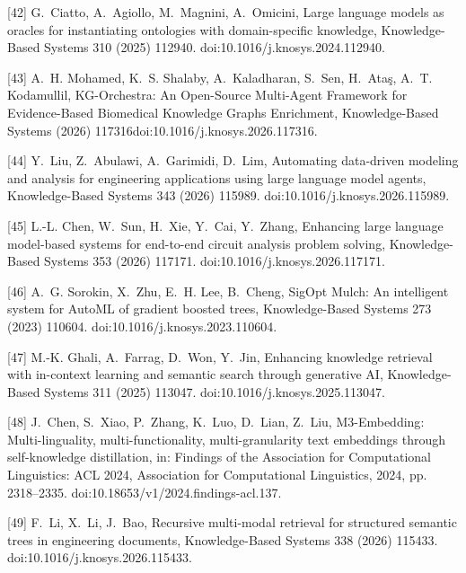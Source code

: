 \documentclass[11pt]{article}
\begin{document}
[42] 
G.~Ciatto, A.~Agiollo, M.~Magnini, A.~Omicini, {Large language models as
  oracles for instantiating ontologies with domain-specific knowledge},
  Knowledge-Based Systems 310 (2025) 112940.
  doi:10.1016/j.knosys.2024.112940.



[43] 
A.~H. Mohamed, K.~S. Shalaby, A.~Kaladharan, S.~Sen, H.~Ata{\c{s}}, A.~T.
  Kodamullil, {KG-Orchestra: An Open-Source Multi-Agent Framework for
  Evidence-Based Biomedical Knowledge Graphs Enrichment}, Knowledge-Based
  Systems (2026) 117316doi:10.1016/j.knosys.2026.117316.



[44] 
Y.~Liu, Z.~Abulawi, A.~Garimidi, D.~Lim, {Automating data-driven modeling and
  analysis for engineering applications using large language model agents},
  Knowledge-Based Systems 343 (2026) 115989.
  doi:10.1016/j.knosys.2026.115989.



[45] 
L.-L. Chen, W.~Sun, H.~Xie, Y.~Cai, Y.~Zhang, {Enhancing large language
  model-based systems for end-to-end circuit analysis problem solving},
  Knowledge-Based Systems 353 (2026) 117171.
  doi:10.1016/j.knosys.2026.117171.



[46] 
A.~G. Sorokin, X.~Zhu, E.~H. Lee, B.~Cheng, {SigOpt Mulch: An intelligent
  system for AutoML of gradient boosted trees}, Knowledge-Based Systems 273
  (2023) 110604.
  doi:10.1016/j.knosys.2023.110604.



[47] 
M.-K. Ghali, A.~Farrag, D.~Won, Y.~Jin, Enhancing knowledge retrieval with
  in-context learning and semantic search through generative {AI},
  Knowledge-Based Systems 311 (2025) 113047.
  doi:10.1016/j.knosys.2025.113047.



[48] 
J.~Chen, S.~Xiao, P.~Zhang, K.~Luo, D.~Lian, Z.~Liu, {M3-Embedding}:
  Multi-linguality, multi-functionality, multi-granularity text embeddings
  through self-knowledge distillation, in: Findings of the Association for
  Computational Linguistics: ACL 2024, Association for Computational
  Linguistics, 2024, pp. 2318--2335.
  doi:10.18653/v1/2024.findings-acl.137.



[49] 
F.~Li, X.~Li, J.~Bao, Recursive multi-modal retrieval for structured semantic
  trees in engineering documents, Knowledge-Based Systems 338 (2026) 115433.
  doi:10.1016/j.knosys.2026.115433.
\end{document}
